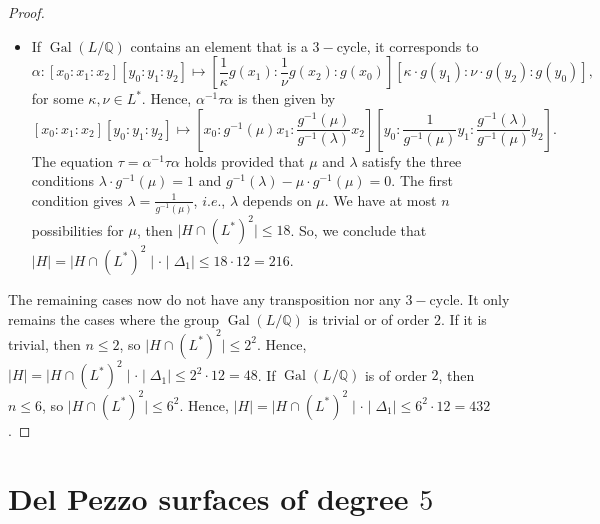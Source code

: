 \documentclass[leqno,12pt]{amsart} %
\newcommand{\Q}{\ensuremath{\mathbb{Q} }}
\DeclareMathOperator{\Gal}{Gal}
\begin{document}
\begin{proof}
\begin{itemize}
\item [b)] If $\Gal(L/\Q)$ contains an element that is a $3-$cycle, it corresponds to
  \[\alpha:[x_{0}:x_{1}:x_{2}][y_{0}:y_{1}:y_{2}]\mapsto [\frac{1}{\kappa}g(x_{1}):\frac{1}{\nu}g(x_{2}):g(x_{0})][\kappa\cdot g(y_{1}):\nu \cdot g(y_{2}):g(y_{0})],\]
for some $\kappa,\nu\in L^*$. Hence, $\alpha^{-1}\tau \alpha$ is then given by 
\[[x_{0}:x_{1}:x_{2}][y_{0}:y_{1}:y_{2}]\mapsto [ x_{0}: g^{-1}(\mu)x_{1} : \frac{g^{-1}(\mu)}{g^{-1}(\lambda)}x_{2}][ y_{0}:\frac{1}{g^{-1}(\mu)}y_{1}:\frac{g^{-1}(\lambda)}{g^{-1}(\mu)}y_{2}].\]
The equation $\tau=\alpha^{-1}\tau \alpha$ holds provided that $\mu$ and $\lambda$ satisfy the three conditions $\lambda\cdot g^{-1}(\mu)=1$ and $g^{-1}(\lambda)-\mu\cdot g^{-1}(\mu)=0$. The first condition gives $\lambda=\frac{1}{g^{-1}(\mu)}$, $i.e.$, $\lambda$ depends on $\mu$. We have at most $n$ possibilities for $\mu$, then $\mid H\cap\left(L^{*}\right)^2\mid \le  18$. So, we conclude that $\mid H\mid =\mid H\cap\left(L^{*}\right)^2\mid \cdot \mid \Delta_1\mid \le  18\cdot 12=216$.
\end{itemize}
The remaining cases now do not have any transposition nor any $3-$cycle. It only remains the cases where the group $\Gal(L/\Q)$ is trivial or of order $2$. If it is trivial, then $n\le 2$, so $\mid H\cap\left(L^{*}\right)^2\mid \le  2^2$. Hence, $\mid H\mid =\mid H\cap\left(L^{*}\right)^2\mid \cdot \mid \Delta_1\mid \le  2^2\cdot 12=48$. If $\Gal(L/\Q)$ is of order $2$, then $n\le 6$, so $\mid H\cap\left(L^{*}\right)^2\mid \le  6^2$. Hence, $\mid H\mid =\mid H\cap\left(L^{*}\right)^2\mid \cdot \mid \Delta_1\mid \le  6^2\cdot 12=432$.
\end{proof}

\section{\texorpdfstring{Del Pezzo surfaces of degree $5$}{Del Pezzo surfaces of degree 5}}
\end{document}
